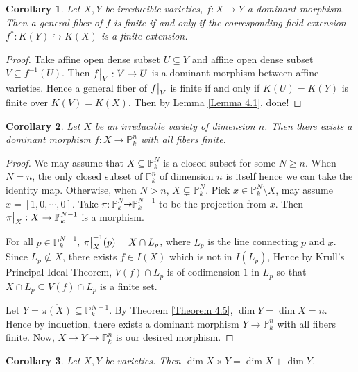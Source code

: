 \documentclass{ctexart}
\newtheorem{corollary}{Corollary}[section]
\begin{document}
\begin{corollary}
    Let $X, Y$ be irreducible varieties, $f: X \rightarrow Y$ a dominant morphism.
    Then a general fiber of $f$ is finite if and only if the corresponding field extension $f^{\ast}: K(Y) \hookrightarrow K(X)$ is a finite extension.
    \label{Corollary 4.5}
\end{corollary}
\begin{proof}
    Take affine open dense subset $U \subseteq Y$ and affine open dense subset $V \subseteq f^{-1}(U)$.
    Then $f\big{|}_{V}: V \rightarrow U$ is a dominant morphism between affine varieties.
    Hence a general fiber of $f\big{|}_{V}$ is finite if and only if $K(U) = K(Y)$ is finite over $K(V) = K(X)$.
    Then by Lemma \ref{Lemma 4.1}, done!
\end{proof}
\begin{corollary}
    Let $X$ be an irreducible variety of dimension $n$.
    Then there exists a dominant morphism $f: X \rightarrow \mathbb{P}_{k}^{n}$ with all fibers finite.
    \label{Corollary 4.6}
\end{corollary}
\begin{proof}
    We may assume that $X \subseteq \mathbb{P}_{k}^{N}$ is a closed subset for some $N \ge n$.
    When $N = n$, the only closed subset of $\mathbb{P}_{k}^{n}$ of dimension $n$ is itself hence we can take the identity map.
    Otherwise, when $N > n$, $X \subsetneq \mathbb{P}_{k}^{N}$.
    Pick $x\in \mathbb{P}_{k}^{N} \setminus X$, may assume $x = [1, 0, \cdots, 0]$.
    Take $\pi: \mathbb{P}_{k}^{N} \dashrightarrow \mathbb{P}_{k}^{N - 1}$ to be the projection from $x$.
    Then $\pi\big{|}_{X}: X \rightarrow \mathbb{P}_{k}^{N - 1}$ is a morphism.
    \par
    For all $p\in \mathbb{P}_{k}^{N - 1}$, $\pi\big{|}_{X}^{-1}(p) = X \cap L_{p}$,
    where $L_{p}$ is the line connecting $p$ and $x$.
    Since $L_{p} \not\subset X$, there exists $f\in I(X)$ which is not in $I(L_{p})$,
    Hence by Krull's Principal Ideal Theorem, $V(f) \cap L_{p}$ is of codimension $1$ in $L_{p}$ so that $X \cap L_{p} \subseteq V(f) \cap L_{p}$ is a finite set.
    \par
    Let $Y = \overline{\pi(X)} \subseteq \mathbb{P}_{k}^{N - 1}$.
    By Theorem \ref{Theorem 4.5}, $\dim Y = \dim X = n$.
    Hence by induction, there exists a dominant morphism $Y \rightarrow \mathbb{P}_{k}^{n}$ with all fibers finite.
    Now, $X \rightarrow Y \rightarrow \mathbb{P}_{k}^{n}$ is our desired morphism.
\end{proof}
\begin{corollary}
    Let $X, Y$ be varieties.
    Then $\dim X \times Y = \dim X + \dim Y$.
    \label{Corollary 4.7}
\end{corollary}
\end{document}
